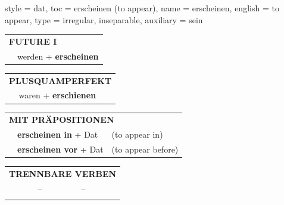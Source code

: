 \begin{verbentry}{
  style = {dat},
  toc = {erscheinen (to appear)},
  name = {erscheinen},
  english = {to appear},
  type = {irregular, inseparable},
  auxiliary = {sein}
}
\begin{tabular}{rl}
    \multicolumn{2}{l}{\textbf{FUTURE I} }\\
   & werden + \textbf{erscheinen}\\
 
  \end{tabular}
\hfill
   \begin{tabular}{rl}
      \multicolumn{2}{l}{\textbf{PLUSQUAMPERFEKT}}\\
   & waren + \textbf{erschienen}\\
  \end{tabular}

   \vspace{10pt}

   \begin{tabular}{lll}
      \multicolumn{3}{l}{\textbf{MIT PRÄPOSITIONEN}}\\
& \textbf{erscheinen in} + Dat & (to appear in)\\
& \textbf{erscheinen vor} + Dat & (to appear before)\\
\end{tabular}
  \hfill
   \begin{tabular}{lll}
      \multicolumn{3}{l}{\textbf{TRENNBARE VERBEN}}\\
 & -- & --\\
\vspace{10pt}
  \end{tabular}


  \vspace{-5pt}
\end{verbentry}

